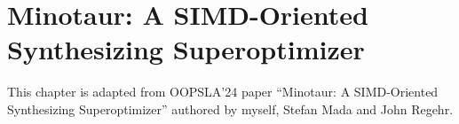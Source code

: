 \chapter{Minotaur: A SIMD-Oriented Synthesizing Superoptimizer}
\label{chap:minotaur}

This chapter is adapted from OOPSLA'24 paper ``Minotaur: A SIMD-Oriented
Synthesizing Superoptimizer'' authored by myself, Stefan Mada and John
Regehr.








